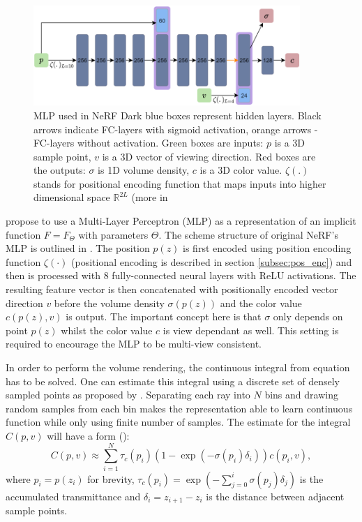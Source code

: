 \begin{figure}[!htb]
    \centering
    \includegraphics[width=0.9\textwidth]{figures/mlp_nerf.png}
    \caption{MLP used in NeRF \cite{mildenhall2020nerf} Dark blue boxes represent hidden layers. Black arrows indicate FC-layers with sigmoid activation, orange arrows - FC-layers without activation. Green boxes are inputs: $p$ is a 3D sample point, $v$ is a 3D vector of viewing direction. Red boxes are the outputs: $\sigma$ is 1D volume density, $c$ is a 3D color value. $\zeta(.)$ stands for positional encoding function that maps inputs into higher dimensional space $\mathbb{R}^{2L}$ (more in }
    \label{fig:mlp_nerf}
\end{figure}

\cite{mildenhall2020nerf} propose to use a Multi-Layer Perceptron (MLP) as a representation
of an implicit function $F = F_\Theta$ with parameters $\Theta$.
The scheme structure of original NeRF's MLP is outlined in .
The position $p(z)$ is first encoded using position encoding function $\zeta(\cdot)$ (positional encoding is described in section \ref{subsec:pos_enc}) and then is processed with 8 fully-connected neural layers with ReLU activations.
The resulting feature vector is then concatenated with positionally encoded vector direction $v$
before the volume density $\sigma(p(z))$ and the color value $c(p(z), v)$ is output.
The important concept here is that $\sigma$ only depends on point $p(z)$
whilst the color value $c$ is view dependant as well.
This setting is required to encourage the MLP to be multi-view consistent.

In order to perform the volume rendering, the continuous integral from equation  has to be solved.
One can estimate this integral using a discrete set of densely sampled points as proposed by \cite{mildenhall2020nerf}.
Separating each ray into $N$ bins and drawing random samples from each bin
makes the representation able to learn continuous function
while only using finite number of samples.
The estimate for the integral $C(p, v)$ will have a form (\cite{mildenhall2020nerf, max1995optical}):
\begin{equation}
    \label{eq:integral_estimation}
    C(p, v) \approx \sum_{i=1}^{N} \tau_c(p_i) (1 - \exp (-\sigma(p_i) \delta_i)) c(p_i, v),
\end{equation}
where $p_i = p(z_i)$ for brevity, $\tau_c(p_i) = \exp (-\sum_{j=0}^i \sigma(p_j) \delta_j )$ is the accumulated transmittance and $\delta_i = z_{i+1} - z_i$ is the distance between adjacent sample points.

